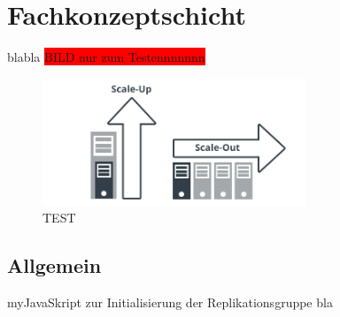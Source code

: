 \chapter{Fachkonzeptschicht}
blabla
\colorbox{red}{BILD nur zum Testennnnnnn}
\begin{figure}
\centering
\includegraphics[width=0.7\textwidth]{resources/scales}
\caption[TEST]{TEST\protect\footnotemark}
\label{img:scales}
\end{figure}
\section{Allgemein}

\begin{listingsboxJava}[label={lst:X}]{myJava}{Skript zur Initialisierung der Replikationsgruppe}
bla
\end{listingsboxJava}